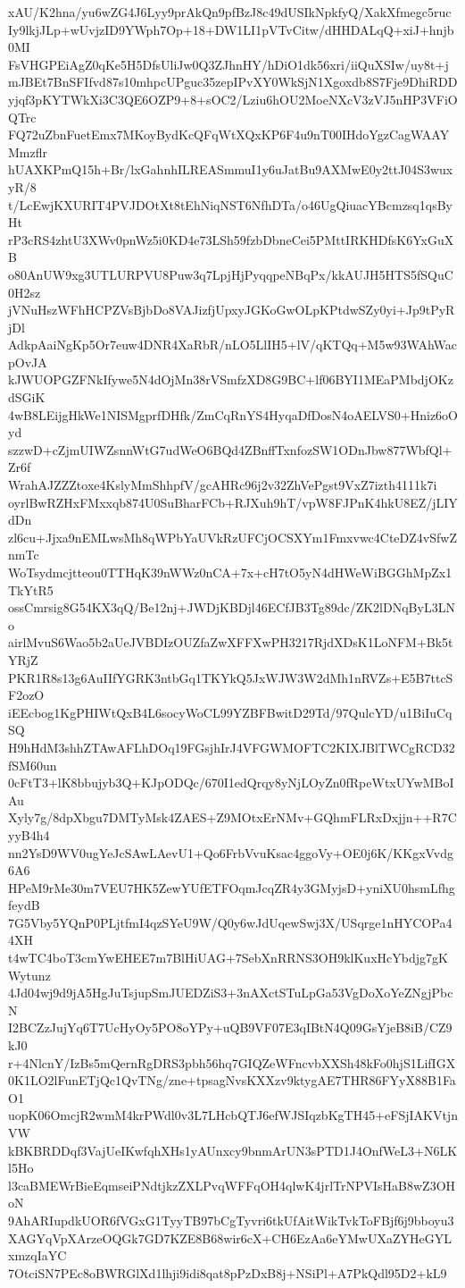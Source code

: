 xAU/K2hna/yu6wZG4J6Lyy9prAkQn9pfBzJ8c49dUSIkNpkfyQ/XakXfmegc5ruc
Iy9lkjJLp+wUvjzID9YWph7Op+18+DW1LI1pVTvCitw/dHHDALqQ+xiJ+hnjb0MI
FsVHGPEiAgZ0qKe5H5DfsUliJw0Q3ZJhnHY/hDiO1dk56xri/iiQuXSIw/uy8t+j
mJBEt7BnSFIfvd87s10mhpcUPguc35zepIPvXY0WkSjN1Xgoxdb8S7Fje9DhiRDD
yjqf3pKYTWkXi3C3QE6OZP9+8+sOC2/Lziu6hOU2MoeNXcV3zVJ5nHP3VFiOQTrc
FQ72uZbnFuetEmx7MKoyBydKcQFqWtXQxKP6F4u9nT00IHdoYgzCagWAAYMmzflr
hUAXKPmQ15h+Br/lxGahnhILREASmmuI1y6uJatBu9AXMwE0y2ttJ04S3wuxyR/8
t/LcEwjKXURIT4PVJDOtXt8tEhNiqNST6NfhDTa/o46UgQiuacYBcmzsq1qsByHt
rP3cRS4zhtU3XWv0pnWz5i0KD4e73LSh59fzbDbneCei5PMttIRKHDfsK6YxGuXB
o80AnUW9xg3UTLURPVU8Puw3q7LpjHjPyqqpeNBqPx/kkAUJH5HTS5fSQuC0H2sz
jVNuHszWFhHCPZVsBjbDo8VAJizfjUpxyJGKoGwOLpKPtdwSZy0yi+Jp9tPyRjDl
AdkpAaiNgKp5Or7euw4DNR4XaRbR/nLO5LlIH5+lV/qKTQq+M5w93WAhWacpOvJA
kJWUOPGZFNkIfywe5N4dOjMn38rVSmfzXD8G9BC+lf06BYI1MEaPMbdjOKzdSGiK
4wB8LEijgHkWe1NISMgprfDHfk/ZmCqRnYS4HyqaDfDosN4oAELVS0+Hniz6oOyd
szzwD+cZjmUIWZsnnWtG7udWeO6BQd4ZBnffTxnfozSW1ODnJbw877WbfQl+Zr6f
WrahAJZZZtoxe4KslyMmShhpfV/gcAHRc96j2v32ZhVePgst9VxZ7izth4111k7i
oyrlBwRZHxFMxxqb874U0SuBharFCb+RJXuh9hT/vpW8FJPnK4hkU8EZ/jLIYdDn
zl6cu+Jjxa9nEMLwsMh8qWPbYaUVkRzUFCjOCSXYm1Fmxvwc4CteDZ4vSfwZnmTc
WoTsydmcjtteou0TTHqK39nWWz0nCA+7x+cH7tO5yN4dHWeWiBGGhMpZx1TkYtR5
ossCmrsig8G54KX3qQ/Be12nj+JWDjKBDjl46ECfJB3Tg89dc/ZK2lDNqByL3LNo
airlMvuS6Wao5b2aUeJVBDIzOUZfaZwXFFXwPH3217RjdXDsK1LoNFM+Bk5tYRjZ
PKR1R8s13g6AuIIfYGRK3ntbGq1TKYkQ5JxWJW3W2dMh1nRVZs+E5B7ttcSF2ozO
iEEcbog1KgPHIWtQxB4L6socyWoCL99YZBFBwitD29Td/97QulcYD/u1BiIuCqSQ
H9hHdM3shhZTAwAFLhDOq19FGsjhIrJ4VFGWMOFTC2KIXJBlTWCgRCD32fSM60un
0cFtT3+lK8bbujyb3Q+KJpODQc/670I1edQrqy8yNjLOyZn0fRpeWtxUYwMBoIAu
Xyly7g/8dpXbgu7DMTyMsk4ZAES+Z9MOtxErNMv+GQhmFLRxDxjjn++R7CyyB4h4
nn2YsD9WV0ugYeJcSAwLAevU1+Qo6FrbVvuKsac4ggoVy+OE0j6K/KKgxVvdg6A6
HPeM9rMe30m7VEU7HK5ZewYUfETFOqmJcqZR4y3GMyjsD+yniXU0hsmLfhgfeydB
7G5Vby5YQnP0PLjtfmI4qzSYeU9W/Q0y6wJdUqewSwj3X/USqrge1nHYCOPa44XH
t4wTC4boT3cmYwEHEE7m7BlHiUAG+7SebXnRRNS3OH9klKuxHcYbdjg7gKWytunz
4Jd04wj9d9jA5HgJuTsjupSmJUEDZiS3+3nAXctSTuLpGa53VgDoXoYeZNgjPbcN
I2BCZzJujYq6T7UcHyOy5PO8oYPy+uQB9VF07E3qIBtN4Q09GsYjeB8iB/CZ9kJ0
r+4NlcnY/IzBs5mQernRgDRS3pbh56hq7GIQZeWFncvbXXSh48kFo0hjS1LifIGX
0K1LO2lFunETjQc1QvTNg/zne+tpsagNvsKXXzv9ktygAE7THR86FYyX88B1FaO1
uopK06OmcjR2wmM4krPWdl0v3L7LHcbQTJ6efWJSIqzbKgTH45+eFSjIAKVtjnVW
kBKBRDDqf3VajUeIKwfqhXHs1yAUnxcy9bnmArUN3sPTD1J4OnfWeL3+N6LKl5Ho
l3caBMEWrBieEqmseiPNdtjkzZXLPvqWFFqOH4qlwK4jrlTrNPVIsHaB8wZ3OHoN
9AhARIupdkUOR6fVGxG1TyyTB97bCgTyvri6tkUfAitWikTvkToFBjf6j9bboyu3
XAGYqVpXArzeOQGk7GD7KZE8B68wir6cX+CH6EzAa6eYMwUXaZYHeGYLxmzqIaYC
7OtciSN7PEc8oBWRGlXd1lhji9idi8qat8pPzDxB8j+NSiPl+A7PkQdl95D2+kL9
